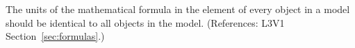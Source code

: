 The units of the mathematical formula in the  element of every
\KineticLaw object in a model should be identical to all \KineticLaw
objects in the model.  (References: L3V1 Section~\ref{sec:formulas}.)

